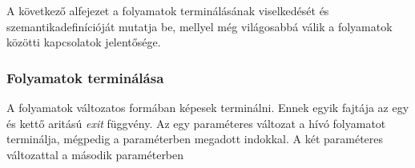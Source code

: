 A következő alfejezet a folyamatok terminálásának viselkedését és szemantikadefinícióját mutatja be, mellyel még világosabbá válik a folyamatok közötti kapcsolatok jelentősége.


\subsubsection{Folyamatok terminálása}

A folyamatok változatos formában képesek terminálni. Ennek egyik fajtája az egy és kettő aritású \textit{exit} függvény. Az egy paraméteres változat a hívó folyamatot terminálja, mégpedig a paraméterben megadott indokkal. A két paraméteres változattal a második paraméterben 




